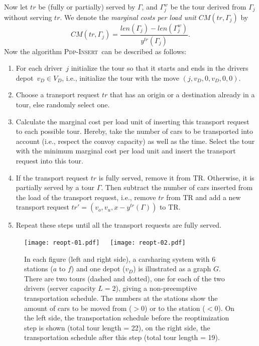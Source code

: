 \documentclass[english]{llncs}
\numberwithin{sublemma}{lemma}
\newcommand{\capd}{\ensuremath{L}}
\newcommand{\tourd}{\ensuremath{\Gamma}}
\newcommand{\TR}{\mathrm{TR}}
\newcommand{\PDPINSERT}{\textsc{Pdp-Insert}\xspace}
\newcommand{\VD}{V_D}
\begin{document}
Now let $tr$ be (fully or partially) served by $\tourd$, and $\tourd^w_j$ be the tour derived from $\tourd_j$ without serving $tr$.
We denote the \emph{marginal costs per load unit} $CM(tr, \tourd_j)$ by
\[
 CM(tr, \tourd_j) = \frac{len(\tourd_j) - len(\tourd^w_j)}{y^{tr}(\tourd_j)}.
\]
Now the algorithm \PDPINSERT\ can be described as follows:
\begin{enumerate}
\item For each driver~$j$ initialize the tour so that it starts and ends in the drivers depot~$v_D \in \VD$, i.e., initialize the tour with the move $(j, v_D, 0, v_D, 0, 0)$.
\item Choose a transport request $tr$ that has an origin or a destination already in a tour, else randomly select one.
\item Calculate the marginal cost per load unit of inserting this transport request to each possible tour.
      Hereby, take the number of cars to be transported into account (i.e., respect the convoy capacity) as well as the time.
      Select the tour with the minimum marginal cost per load unit and insert the transport request into this tour.
\item If the transport request $tr$ is fully served, remove it from $\TR$.
      Otherwise, it is partially served by a tour $\tourd$.
      Then subtract the number of cars inserted from the load of the transport request, i.e., remove $tr$ from $\TR$ and add a new transport request $tr' = (v_o, v_u, x - y^{tr}(\tourd))$ to $\TR$.
\item Repeat these steps until all the transport requests are fully served.
\end{enumerate}


\begin{figure}[ht]
    \centering
\texttt{[image: reopt-01.pdf]} $\, \, \, \, \,$ \texttt{[image: reopt-02.pdf]}
 \caption{
          In each figure (left and right side), a carsharing system with 6 stations ($a$ to $f$) and one depot ($v_D$) is illustrated as a graph $G$.
          There are two tours (dashed and dotted), one for each of the two drivers (server capacity $\capd = 2$), giving a non-preemptive transportation schedule.
          The numbers at the stations show the amount of cars to be moved from ($> 0$) or to the station ($< 0$).
          On the left side, the transportation schedule before the reoptimization step is shown (total tour length = 22), on the right side, the transportation schedule after this step (total tour length = 19).
 }
 \label{fig: reopt}
\end{figure}
\end{document}

